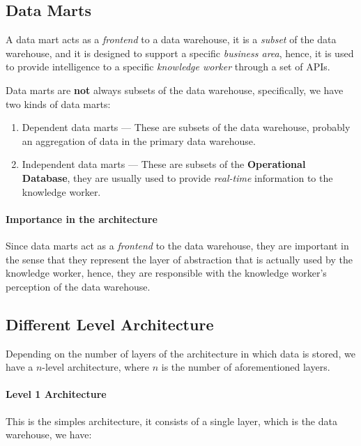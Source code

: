 \documentclass[openright, twoside, twocolumn, a4paper, 10pt]{report}
\begin{document}
\subsection{Data Marts}

A data mart acts as a \emph{frontend} to a data warehouse, it is a \emph{subset} of the data warehouse,
and it is designed to support a specific \emph{business area}, hence, it is used
to provide intelligence to a specific \emph{knowledge worker} through a set of APIs.

Data marts are \textbf{not} always subsets of the data warehouse, specifically, we
have two kinds of data marts:

\begin{enumerate}
	\item Dependent data marts --- These are subsets of the data warehouse, probably
	      an aggregation of data in the primary data warehouse.
	\item Independent data marts --- These are subsets of the \textbf{Operational Database},
	      they are usually used to provide \emph{real-time} information to the knowledge worker.
\end{enumerate}

\paragraph{Importance in the architecture}

Since data marts act as a \emph{frontend} to the data warehouse, they are important
in the sense that they represent the layer of abstraction that is actually
used by the knowledge worker, hence, they are responsible with the knowledge worker's
perception of the data warehouse.

\subsection{Different Level Architecture}
Depending on the number of layers of the architecture in which data
is stored, we have a $n$-level architecture, where $n$ is the number of aforementioned layers.

\paragraph{Level 1 Architecture}

This is the simples architecture, it consists of a single layer, which is the
data warehouse, we have:
\end{document}

